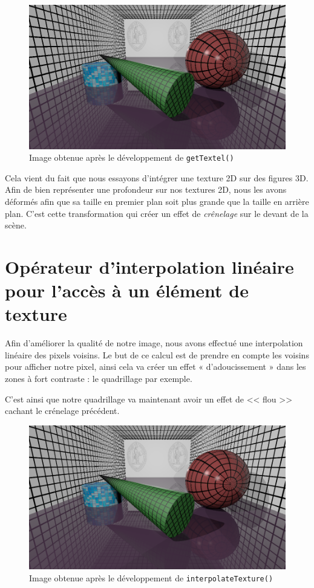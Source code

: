 \documentclass[a4paper, 11pt]{article}
\begin{document}
	\begin{figure}[H]
		\centering
		\includegraphics[width=13cm]{images/1-monimage.png}
		\caption{Image obtenue après le développement de \texttt{getTextel()}}
		\label{fig:fig1}
	\end{figure}
	Cela vient du fait que nous essayons d'intégrer une texture 2D sur des figures 3D. Afin de bien représenter une profondeur sur nos textures 2D, nous les
	avons déformés afin que sa taille en premier plan soit plus grande que la taille en arrière plan. C'est cette transformation qui créer un effet de
	\textit{crênelage} sur le devant de la scène.

	\section{Opérateur d'interpolation linéaire pour l'accès à un élément de texture}
	Afin d'améliorer la qualité de notre image, nous avons effectué une interpolation linéaire des pixels voisins. Le but de ce calcul est de prendre en compte
	les voisins pour afficher notre pixel, ainsi cela va créer un effet « d'adoucissement » dans les zones à fort contraste : le quadrillage par exemple.

	C'est ainsi que notre quadrillage va maintenant avoir un effet de << flou >> cachant le crénelage précédent. 
	\begin{figure}[H]
		\centering
		\includegraphics[width=13cm]{images/2-monimage.png}
		\caption{Image obtenue après le développement de \texttt{interpolateTexture()}}
		\label{fig:fig1}
	\end{figure}
\end{document}
